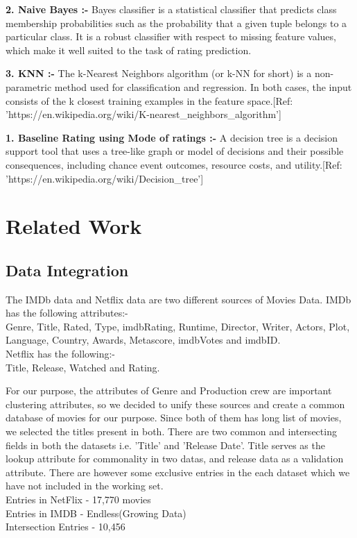 \documentclass[11pt]{article}
\begin{document}
	{\bfseries 2. Naive Bayes :-} 
		Bayes classifier is a statistical classifier that predicts class membership probabilities such as the probability that a given tuple belongs to a particular class. It is a robust classifier with respect to missing feature values, which make it well suited to the task of rating prediction.
		
	{\bfseries 3. KNN :-} 
		The k-Nearest Neighbors algorithm (or k-NN for short) is a non-parametric method used for classification and regression. In both cases, the input consists of the k closest training examples in the feature space.[Ref: 'https://en.wikipedia.org/wiki/K-nearest\_neighbors\_algorithm']
		
	{\bfseries 1. Baseline Rating using Mode of ratings :-} 
		A decision tree is a decision support tool that uses a tree-like graph or model of decisions and their possible consequences, including chance event outcomes, resource costs, and utility.[Ref: 'https://en.wikipedia.org/wiki/Decision\_tree']
		
\section{Related Work}
\subsection{Data Integration}
	The IMDb data and Netflix data are two different sources of Movies Data. IMDb has the following attributes:-\\
Genre, Title, Rated, Type, imdbRating, Runtime, Director, Writer, Actors, Plot, Language, Country, Awards, Metascore, imdbVotes and imdbID.\\
Netflix has the following:-\\
Title, Release, Watched and Rating.


For our purpose, the attributes of Genre and Production crew are important clustering attributes, so we decided to unify these sources and create a common database of movies for our purpose. Since both of them has long list of movies, we selected the titles present in both. There are two common and intersecting fields in both the datasets i.e. 'Title' and 'Release Date'. Title serves as the lookup attribute for commonality in two datas, and release data as a validation attribute. There are however some exclusive entries in the each dataset which we have not included in the working set.\\Entries in NetFlix - 17,770 movies\\Entries in IMDB - Endless(Growing Data)\\Intersection Entries - 10,456\\
\end{document}

